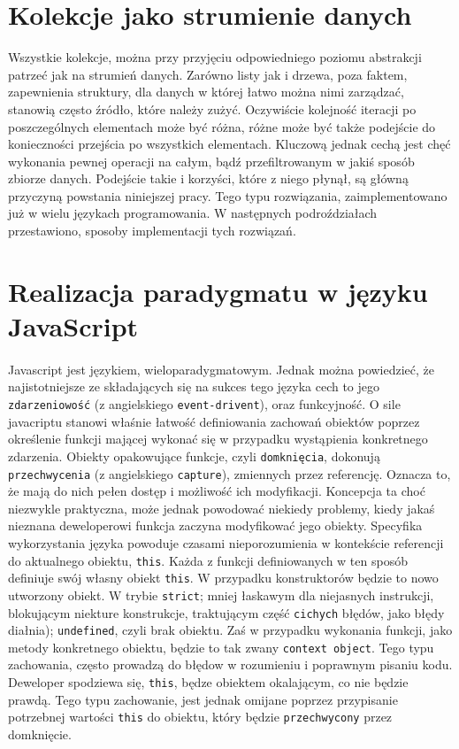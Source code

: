 \documentclass[a4paper,10pt]{report}
\begin{document}
\section{Kolekcje jako strumienie danych}
Wszystkie kolekcje, można przy przyjęciu odpowiedniego poziomu abstrakcji patrzeć jak na strumień danych. Zarówno listy jak i drzewa, poza faktem, zapewnienia struktury, dla danych w której łatwo można nimi zarządzać, stanowią często źródło, które należy zużyć. Oczywiście kolejność iteracji po poszczególnych elementach może być różna, różne może być także podejście do konieczności przejścia po wszystkich elementach. Kluczową jednak cechą jest chęć wykonania pewnej operacji na całym, bądź przefiltrowanym w jakiś sposób zbiorze danych. Podejście takie i korzyści, które z niego płynął, są główną przyczyną powstania niniejszej pracy. Tego typu rozwiązania, zaimplementowano już w wielu językach programowania. W następnych podroździałach przestawiono, sposoby implementacji tych rozwiązań.
\section{Realizacja paradygmatu w języku JavaScript}
\paragraph{}
Javascript jest językiem, wieloparadygmatowym. Jednak można powiedzieć, że najistotniejsze ze składających się na sukces tego języka cech to jego \verb|zdarzeniowość| (z angielskiego \verb|event-drivent|), oraz funkcyjność. O sile javacriptu stanowi właśnie łatwość definiowania zachowań obiektów poprzez określenie funkcji mającej wykonać się w przypadku wystąpienia konkretnego zdarzenia. Obiekty opakowujące funkcje, czyli \verb|domknięcia|, dokonują \verb|przechwycenia| (z angielskiego \verb|capture|), zmiennych przez referencję. Oznacza to, że mają do nich pełen dostęp i możliwość ich modyfikacji. Koncepcja ta choć niezwykle praktyczna, może jednak powodować niekiedy problemy, kiedy jakaś nieznana deweloperowi funkcja zaczyna modyfikować jego obiekty. Specyfika wykorzystania języka powoduje czasami nieporozumienia w kontekście referencji do aktualnego obiektu, \verb|this|. Każda z funkcji definiowanych w ten sposób definiuje swój własny obiekt \verb|this|. W przypadku konstruktorów będzie to nowo utworzony obiekt. W trybie \verb|strict|; mniej łaskawym dla niejasnych instrukcji, blokującym niekture konstrukcje, traktującym część \verb|cichych| błędów, jako błędy diałnia); \verb|undefined|, czyli brak obiektu. Zaś w przypadku wykonania funkcji, jako metody konkretnego obiektu, będzie to tak zwany \verb|context object|. Tego typu zachowania, często prowadzą do błędow w rozumieniu i poprawnym pisaniu kodu. Deweloper spodziewa się, \verb|this|, będze obiektem okalającym, co nie będzie prawdą. Tego typu zachowanie, jest jednak omijane poprzez przypisanie potrzebnej wartości \verb|this| do obiektu, który będzie \verb|przechwycony| przez domknięcie.
\end{document}
